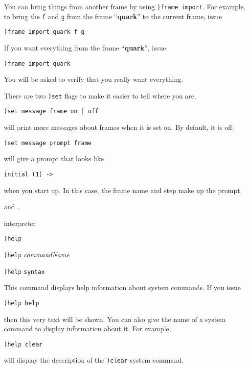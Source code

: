 You can bring things from another frame by using
{\tt )frame import}.
For example, to bring the {\tt f} and {\tt g} from the frame ``{\bf quark}''
to the current frame, issue
\begin{verbatim}
)frame import quark f g
\end{verbatim}
If you want everything from the frame ``{\bf quark}'', issue
\begin{verbatim}
)frame import quark
\end{verbatim}
You will be asked to verify that you really want everything.

There are two {\tt )set} flags
to make it easier to tell where you are.
\begin{verbatim}
)set message frame on | off
\end{verbatim}
will print more messages about frames when it is set on.
By default, it is off.
\begin{verbatim}
)set message prompt frame
\end{verbatim}
will give a prompt
that looks like
\begin{verbatim}
initial (1) ->
\end{verbatim}
when you start up. In this case, the frame name and step make up the
prompt.

\par{}
 and
.




\par{} interpreter

\par{}
\begin{simpleList}
\item{\tt )help}
\item{\tt )help} {\it commandName}
\item{\tt )help} {\tt syntax}
\end{simpleList}

\par{}

This command displays help information about system commands.
If you issue
\begin{verbatim}
)help help
\end{verbatim}
then this very text will be shown.
You can also give the name of a system command
to display information about it.
For example,
\begin{verbatim}
)help clear
\end{verbatim}
will display the description of the {\tt )clear} system command.

